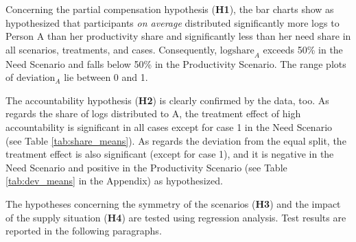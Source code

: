 \documentclass[smallcondensed]{svjour3}
\begin{document}
%
Concerning the partial compensation hypothesis (\textbf{H1}), the bar charts show as hypothesized that participants \textit{on average} distributed significantly more logs to Person A than her productivity share and significantly less than her need share in all scenarios, treatments, and cases. Consequently, $\mbox{logshare}_A$ exceeds 50\% in the Need Scenario and falls below 50\% in the Productivity Scenario. The range plots of $\mbox{deviation}_A$ lie between 0 and 1.\par
%
The accountability hypothesis (\textbf{H2}) is clearly confirmed by the data, too. As regards the share of logs distributed to A, the treatment effect of high accountability is significant in all cases except for case 1 in the Need Scenario (see Table \ref{tab:share_means}). As regards the deviation from the equal split, the treatment effect is also significant (except for case 1), and it is negative in the Need Scenario and positive in the Productivity Scenario (see Table \ref{tab:dev_means} in the Appendix) as hypothesized.\par
%
The hypotheses concerning the symmetry of the scenarios (\textbf{H3}) and the impact of the supply situation (\textbf{H4}) are tested using regression analysis. Test results are reported in the following paragraphs.\par
%
\end{document}
